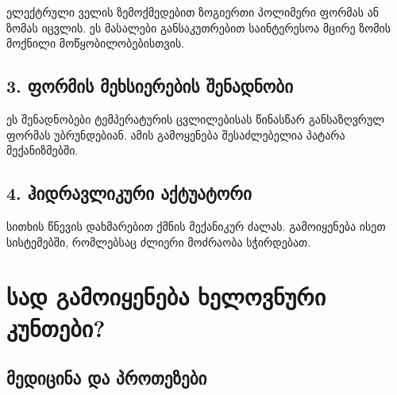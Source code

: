 \documentclass[12pt,a4paper]{article}
\begin{document}
ელექტრული ველის ზემოქმედებით ზოგიერთი პოლიმერი ფორმას ან ზომას იცვლის. ეს მასალები განსაკუთრებით საინტერესოა მცირე ზომის მოქნილი მოწყობილობებისთვის.

\subsection{3. ფორმის მეხსიერების შენადნობი}

\begin{center}
\end{center}

ეს შენადნობები ტემპერატურის ცვლილებისას წინასწარ განსაზღვრულ ფორმას უბრუნდებიან. ამის გამოყენება შესაძლებელია პატარა მექანიზმებში.

\subsection{4. ჰიდრავლიკური აქტუატორი}

\begin{center}
\end{center}

სითხის წნევის დახმარებით ქმნის მექანიკურ ძალას. გამოიყენება ისეთ სისტემებში, რომლებსაც ძლიერი მოძრაობა სჭირდებათ.


\section{სად გამოიყენება ხელოვნური კუნთები?}

\subsection{მედიცინა და პროთეზები}
\end{document}
